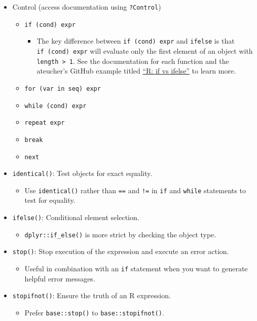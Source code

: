 \documentclass[
]{book}
\providecommand{\tightlist}{%
  \setlength{\itemsep}{0pt}\setlength{\parskip}{0pt}}
\begin{document}
\begin{itemize}
\tightlist
\item
  Control (access documentation using \texttt{?Control})

  \begin{itemize}
  \tightlist
  \item
    \texttt{if\ (cond)\ expr}

    \begin{itemize}
    \tightlist
    \item
      The key difference between \texttt{if\ (cond)\ expr} and \texttt{ifelse} is that \texttt{if\ (cond)\ expr} will evaluate only the first element of an object with \texttt{length\ \textgreater{}\ 1}. See the documentation for each function and the ateucher's GitHub example titled \href{https://gist.github.com/ateucher/c7359f566eded9fcd4a255f4cbd4fe67}{``R: if vs ifelse''} to learn more.
    \end{itemize}
  \item
    \texttt{for\ (var\ in\ seq)\ expr}
  \item
    \texttt{while\ (cond)\ expr}
  \item
    \texttt{repeat\ expr}
  \item
    \texttt{break}
  \item
    \texttt{next}
  \end{itemize}
\item
  \texttt{identical()}: Test objects for exact equality.

  \begin{itemize}
  \tightlist
  \item
    Use \texttt{identical()} rather than \texttt{==} and \texttt{!=} in \texttt{if} and \texttt{while} statements to test for equality.
  \end{itemize}
\item
  \texttt{ifelse()}: Conditional element selection.

  \begin{itemize}
  \tightlist
  \item
    \texttt{dplyr::if\_else()} is more strict by checking the object type.
  \end{itemize}
\item
  \texttt{stop()}: Stop execution of the expression and execute an error action.

  \begin{itemize}
  \tightlist
  \item
    Useful in combination with an \texttt{if} statement when you want to generate helpful error messages.
  \end{itemize}
\item
  \texttt{stopifnot()}: Ensure the truth of an R expression.

  \begin{itemize}
  \tightlist
  \item
    Prefer \texttt{base::stop()} to \texttt{base::stopifnot()}.
  \end{itemize}
\end{itemize}
\end{document}
